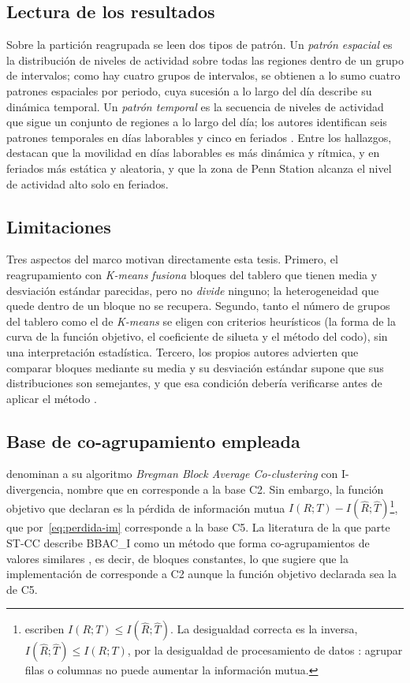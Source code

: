 \subsection{Lectura de los resultados}

Sobre la partición reagrupada se leen dos tipos de patrón. Un \emph{patrón
espacial} es la distribución de niveles de actividad sobre todas las regiones
dentro de un grupo de intervalos; como hay cuatro grupos de intervalos, se
obtienen a lo sumo cuatro patrones espaciales por periodo, cuya sucesión a lo
largo del día describe su dinámica temporal. Un \emph{patrón temporal} es la
secuencia de niveles de actividad que sigue un conjunto de regiones a lo largo
del día; los autores identifican seis patrones temporales en días laborables y
cinco en feriados \cite[Sec.~IV.D]{Liu2021}. Entre los hallazgos, destacan que la
movilidad en días laborables es más dinámica y rítmica, y en feriados más
estática y aleatoria, y que la zona de Penn Station alcanza el nivel de actividad
alto solo en feriados.

\subsection{Limitaciones}\label{sec:stcc-limitaciones}

Tres aspectos del marco motivan directamente esta tesis. Primero, el
reagrupamiento con \textit{K-means} \emph{fusiona} bloques del tablero que tienen
media y desviación estándar parecidas, pero no \emph{divide} ninguno; la
heterogeneidad que quede dentro de un bloque no se recupera. Segundo, tanto el
número de grupos del tablero como el de \textit{K-means} se eligen con criterios
heurísticos (la forma de la curva de la función objetivo, el coeficiente de
silueta y el método del codo), sin una interpretación estadística. Tercero, los
propios autores advierten que comparar bloques mediante su media y su desviación
estándar supone que sus distribuciones son semejantes, y que esa condición
debería verificarse antes de aplicar el método \cite[Sec.~IV.E]{Liu2021}.

\subsection{Base de co-agrupamiento empleada}\label{sec:stcc-base}

\cite{Liu2021} denominan a su algoritmo \emph{Bregman Block Average
Co-clustering} con I-divergencia, nombre que en \cite[Sec.~3]{Banerjee2007}
corresponde a la base C2. Sin embargo, la función objetivo que declaran es la
pérdida de información mutua $I(R;T) - I(\hat{R};\hat{T})$\footnote{\cite{Liu2021}
escriben $I(R;T) \le I(\hat{R};\hat{T})$. La desigualdad correcta es la inversa,
$I(\hat{R};\hat{T}) \le I(R;T)$, por la desigualdad de procesamiento de datos
\cite{Cover2006}: agrupar filas o columnas no puede aumentar la información
mutua.}, que por~\eqref{eq:perdida-im} corresponde a la base C5. La literatura de
la que parte ST-CC describe BBAC\_I como un método que forma co-agrupamientos de
valores similares \cite{Wu2022}, es decir, de bloques constantes, lo que sugiere
que la implementación de \cite{Liu2021} corresponde a C2 aunque la función
objetivo declarada sea la de C5.

